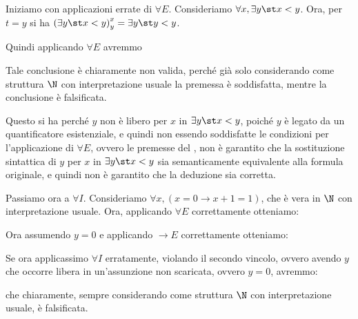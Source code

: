 Iniziamo con applicazioni errate di \(\forall E\). Consideriamo \(\forall x, \exists y\st x < y\). Ora, per \(t=y\) si ha \(\subs{\exists y\st x < y}{x}{y} = \exists y\st y < y\).

Quindi applicando \(\forall E\) avremmo

\begin{prooftree}
\end{prooftree}

Tale conclusione è chiaramente non valida, perché già solo considerando come struttura \(\N\) con interpretazione usuale la premessa è soddisfatta, mentre la conclusione è falsificata.

Questo si ha perché \(y\) non è libero per \(x\) in \(\exists y\st x < y\), poiché \(y\) è legato da un quantificatore esistenziale, e quindi non essendo soddisfatte le condizioni per l'applicazione di \(\forall E\), ovvero le premesse del , non è garantito che la sostituzione sintattica di \(y\) per \(x\) in \(\exists y\st x < y\) sia semanticamente equivalente alla formula originale, e quindi non è garantito che la deduzione sia corretta.

Passiamo ora a \(\forall I\). Consideriamo \(\forall x, (x=0\to x+1=1)\), che è vera in \(\N\) con interpretazione usuale. Ora, applicando \(\forall E\) correttamente otteniamo:

\begin{prooftree}
\end{prooftree}

Ora assumendo \(y=0\) e applicando \(\to E\) correttamente otteniamo:

\begin{prooftree}
\end{prooftree}

Se ora applicassimo \(\forall I\) erratamente, violando il secondo vincolo, ovvero avendo \(y\) che occorre libera in un'assunzione non scaricata, ovvero \(y=0\), avremmo:

\begin{prooftree}
\end{prooftree}
che chiaramente, sempre considerando come struttura \(\N\) con interpretazione usuale, è falsificata.


